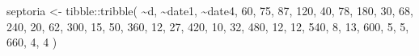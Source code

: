 \documentclass[
  letterpaper,
  DIV=11,
  numbers=noendperiod]{scrreprt}
\newenvironment{Shaded}{\begin{snugshade}}{\end{snugshade}}
\newcommand{\DecValTok}[1]{\textcolor[rgb]{0.68,0.00,0.00}{#1}}
\newcommand{\FunctionTok}[1]{\textcolor[rgb]{0.28,0.35,0.67}{#1}}
\newcommand{\NormalTok}[1]{\textcolor[rgb]{0.00,0.23,0.31}{#1}}
\newcommand{\OtherTok}[1]{\textcolor[rgb]{0.00,0.23,0.31}{#1}}
\newcommand{\SpecialCharTok}[1]{\textcolor[rgb]{0.37,0.37,0.37}{#1}}
\begin{document}
\begin{Shaded}
\begin{Highlighting}[]
\NormalTok{septoria }\OtherTok{\textless{}{-}} 
\NormalTok{tibble}\SpecialCharTok{::}\FunctionTok{tribble}\NormalTok{(}
 \SpecialCharTok{\textasciitilde{}}\NormalTok{d, }\SpecialCharTok{\textasciitilde{}}\NormalTok{date1, }\SpecialCharTok{\textasciitilde{}}\NormalTok{date4,}
 \DecValTok{60}\NormalTok{,    }\DecValTok{75}\NormalTok{,    }\DecValTok{87}\NormalTok{,}
 \DecValTok{120}\NormalTok{,    }\DecValTok{40}\NormalTok{,    }\DecValTok{78}\NormalTok{,}
 \DecValTok{180}\NormalTok{,    }\DecValTok{30}\NormalTok{,    }\DecValTok{68}\NormalTok{,}
 \DecValTok{240}\NormalTok{,    }\DecValTok{20}\NormalTok{,    }\DecValTok{62}\NormalTok{,}
 \DecValTok{300}\NormalTok{,    }\DecValTok{15}\NormalTok{,    }\DecValTok{50}\NormalTok{,}
 \DecValTok{360}\NormalTok{,    }\DecValTok{12}\NormalTok{,    }\DecValTok{27}\NormalTok{,}
 \DecValTok{420}\NormalTok{,    }\DecValTok{10}\NormalTok{,    }\DecValTok{32}\NormalTok{,}
 \DecValTok{480}\NormalTok{,    }\DecValTok{12}\NormalTok{,    }\DecValTok{12}\NormalTok{,}
 \DecValTok{540}\NormalTok{,     }\DecValTok{8}\NormalTok{,    }\DecValTok{13}\NormalTok{,}
 \DecValTok{600}\NormalTok{,     }\DecValTok{5}\NormalTok{,     }\DecValTok{5}\NormalTok{,}
 \DecValTok{660}\NormalTok{,     }\DecValTok{4}\NormalTok{,     }\DecValTok{4}
\NormalTok{              )}


\end{Highlighting}
\end{Shaded}
\end{document}
